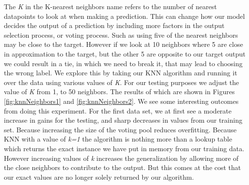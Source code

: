 \documentclass[
	letterpaper, %
]{IEEEtran}
\begin{document}
			The \emph{K} in the K-nearest neighbors name refers to the number of nearest datapoints to look at when making a prediction. This can change how our model decides the output of a prediction by including more factors in the output selection process, or voting process. Such as using five of the nearest neighbors may be close to the target. However if we look at 10 neighbors where 5 are close in approximation to the target, but the other 5 are opposite to our target output we could result in a tie, in which we need to break it, that may lead to choosing the wrong label. We explore this by taking our KNN algorithm and running it over the data using various values of \emph{K}. For our testing purposes we adjust the value of \emph{K} from 1, to 50 neighbors. The results of which are shown in Figures \ref{fig:knnNeighbors1} and \ref{fig:knnNeighbors2}. We see some interesting outcomes from doing this experiment. For the first data set, we at first see a moderate increase in gains for the testing, and sharp decreases in values from our training set. Because increasing the size of the voting pool reduces overfitting. Because KNN with a value of \emph{k=1} the algorithm is nothing more than a lookup table which returns the exact instance we have put in memory from our training data. However increasing values of \emph{k} increases the generalization by allowing more of the close neighbors to contribute to the output. But this comes at the cost that our exact values are no longer solely returned by our algorithm.
	
\end{document}
